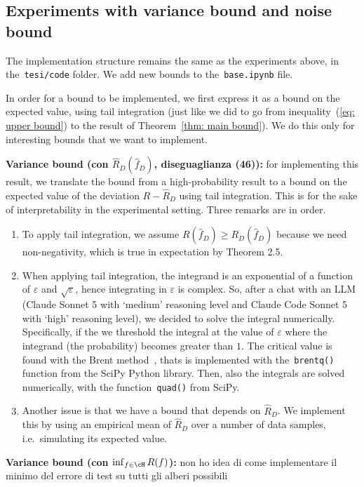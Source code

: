 \subsection{Experiments with variance bound and noise bound}

The implementation structure remains the same as the experiments above, in the~\texttt{tesi/code} folder. We add new bounds to the~\texttt{base.ipynb} file. 

In order for a bound to be implemented, we first express it as a bound on the expected value, using tail integration (just like we did to go from inequality~(\ref{eq: upper bound}) to the result of Theorem~\ref{thm: main bound}). We do this only for interesting bounds that we want to implement. 

{\bf Variance bound (con $\hat R_D (\hat f_D)$, diseguaglianza (46)):} for implementing this result, we translate the bound from a high-probability result to a bound on the expected value of the deviation $R-\hat R_D$ using tail integration. This is for the sake of interpretability in the experimental setting. 
Three remarks are in order. 
\begin{enumerate}
    \item To apply tail integration, we assume $R(\hat f_D)\ge R_D(\hat f_D)$ because we need non-negativity, which is true in expectation by Theorem 2.5.
    \item When applying tail integration, the integrand is an exponential of a function of $\varepsilon$ and $\sqrt\varepsilon$, hence integrating in $\varepsilon$ is complex. So, after a chat with an LLM (Claude Sonnet 5 with `medium' reasoning level and Claude Code Sonnet 5 with `high' reasoning level), we decided to solve the integral numerically. Specifically, if the we threshold the integral at the value of $\varepsilon$ where the integrand (the probability) becomes greater than $1$. The critical value is found with the Brent method~\cite{Brent1973}, thats is implemented with the~\texttt{brentq()} function from the SciPy Python library. Then, also the integrals are solved numerically, with the function~\texttt{quad()} from SciPy. 
    \item Another issue is that we have a bound that depends on $\hat R_D$. We implement this by using an empirical mean of $\hat R_D$ over a number of data samples, i.e.\ simulating its expected value. 
\end{enumerate}


{\bf Variance bound (con $\inf_{f\in\cH} R(f)$):} non ho idea di come implementare il minimo del errore di test su tutti gli alberi possibili

